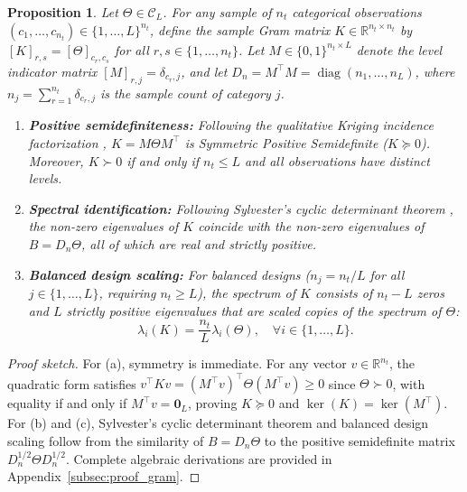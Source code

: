 \documentclass[default,sn-mathphys,Numbered]{sn-jnl}
\theoremstyle{thmstyleone}
\newtheorem{proposition}[theorem]{Proposition}
\theoremstyle{thmstylethree}
\theoremstyle{thmstyletwo}
\newcommand{\diag}{\operatorname{diag}}
\begin{document}
\begin{proposition}

\label{prop:gram_psd}
Let $\Theta \in \mathcal{C}_L$. For any sample of $n_t$ categorical observations $(c_1, \ldots, c_{n_t}) \in \{1, \ldots, L\}^{n_t}$, define the sample Gram matrix $K \in \mathbb{R}^{n_t \times n_t}$ by $[K]_{r, s} = [\Theta]_{c_r, c_s}$ for all $r, s \in \{1, \ldots, n_t\}$. Let $M \in \{0, 1\}^{n_t \times L}$ denote the level indicator matrix $[M]_{r, j} = \delta_{c_r, j}$, and let $D_n = M^\top M = \diag(n_1, \ldots, n_L)$, where $n_j = \sum_{r=1}^{n_t} \delta_{c_r, j}$ is the sample count of category $j$.
\begin{enumerate}
    \item[(a)] \textbf{Positive semidefiniteness:} Following the qualitative Kriging incidence factorization \citep{PDUDE,Zhou}, $K = M \Theta M^\top$ is Symmetric Positive Semidefinite ($K \succeq 0$). Moreover, $K \succ 0$ if and only if $n_t \le L$ and all observations have distinct levels.
    \item[(b)] \textbf{Spectral identification:} Following Sylvester's cyclic determinant theorem \citep{sylvester1851,horn2012matrix}, the non-zero eigenvalues of $K$ coincide with the non-zero eigenvalues of $B = D_n \Theta$, all of which are real and strictly positive.
    \item[(c)] \textbf{Balanced design scaling:} For balanced designs ($n_j = n_t / L$ for all $j \in \{1, \ldots, L\}$, requiring $n_t \ge L$), the spectrum of $K$ consists of $n_t - L$ zeros and $L$ strictly positive eigenvalues that are scaled copies of the spectrum of $\Theta$:
    \begin{equation}
    \label{eq:gram_scaled_eigs}
    \lambda_i(K) = \frac{n_t}{L} \lambda_i(\Theta), \quad \forall i \in \{1, \ldots, L\}.
    \end{equation}
\end{enumerate}
\end{proposition}

\begin{proof}[Proof sketch]
For (a), symmetry is immediate. For any vector $v \in \mathbb{R}^{n_t}$, the quadratic form satisfies $v^\top K v = (M^\top v)^\top \Theta (M^\top v) \ge 0$ since $\Theta \succ 0$, with equality if and only if $M^\top v = \bm{0}_L$, proving $K \succeq 0$ and $\ker(K) = \ker(M^\top)$. For (b) and (c), Sylvester's cyclic determinant theorem and balanced design scaling follow  from the similarity of $B = D_n \Theta$ to the positive semidefinite matrix $D_n^{1/2} \Theta D_n^{1/2}$. Complete algebraic derivations are provided in Appendix~\ref{subsec:proof_gram}.
\end{proof}
\end{document}
